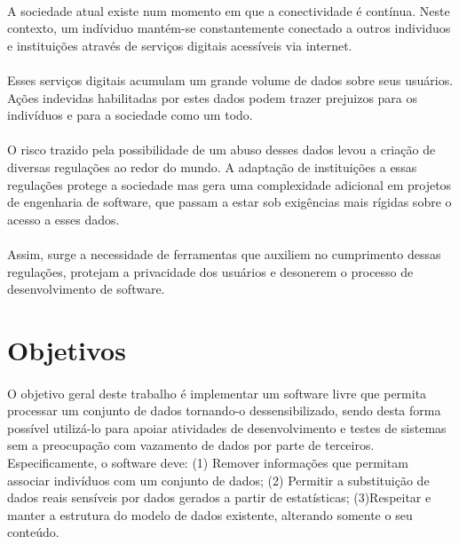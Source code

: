 \paragraph{} A sociedade atual existe num momento em que a conectividade é contínua. Neste contexto, um indíviduo mantém-se constantemente conectado a outros individuos e instituições através de serviços digitais acessíveis via internet.
\paragraph{} Esses serviços digitais  acumulam um grande volume de dados sobre seus usuários. Ações indevidas habilitadas por estes dados podem trazer prejuizos para os indivíduos e para a sociedade como um todo.
\paragraph{} O risco trazido pela possibilidade de um abuso desses dados levou a criação de diversas regulações ao redor do mundo. A adaptação de instituições a essas regulações protege a sociedade mas gera uma complexidade adicional em projetos de engenharia de software, que passam a estar sob exigências mais rígidas sobre o acesso a esses dados.
\paragraph{} Assim, surge a necessidade de ferramentas que auxiliem no cumprimento dessas regulações, protejam a privacidade dos usuários e desonerem o processo de desenvolvimento de software.


\section{Objetivos}

\paragraph{} O objetivo geral deste trabalho é implementar um software livre que permita processar um conjunto de dados tornando-o dessensibilizado, sendo desta forma possível utilizá-lo para apoiar atividades de desenvolvimento e testes de sistemas sem a preocupação com vazamento de dados por parte de terceiros.
Especificamente, o software deve: (1) Remover informações que permitam associar indivíduos com um conjunto de dados; (2) Permitir a substituição de dados reais sensíveis por dados gerados a partir de estatísticas; (3)Respeitar e manter a estrutura do modelo de dados existente, alterando somente o seu conteúdo.


